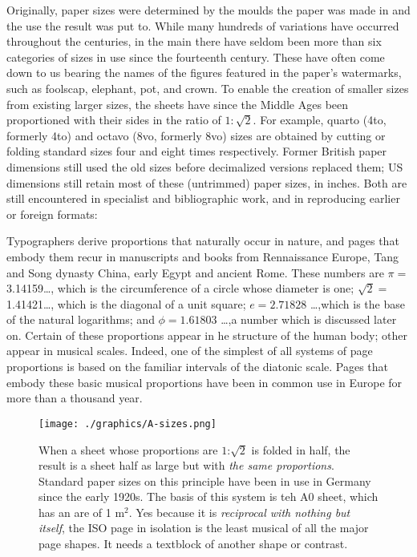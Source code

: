 Originally, paper sizes were determined by the moulds the paper was
made in and the use the result was put to. While many hundreds of variations have occurred throughout the centuries, in the main there have seldom been more than six categories of sizes in use since the fourteenth century. These have often come down to us bearing the names of the figures featured in the paper's watermarks, such as foolscap,
elephant, pot, and crown. To enable the creation of smaller sizes from
existing larger sizes, the sheets have since the Middle Ages been proportioned
with their sides in the ratio of \(1:\sqrt{2}\). For example, quarto (4to,
formerly 4to) and octavo (8vo, formerly 8vo) sizes are obtained by cutting
or folding standard sizes four and eight times respectively.
Former British paper dimensions still used the old sizes before decimalized
versions replaced them; US dimensions still retain most of these
(untrimmed) paper sizes, in inches. Both are still encountered in specialist and bibliographic work, and in reproducing earlier or foreign formats:



Typographers derive proportions that naturally occur in nature, and pages that embody
them recur in manuscripts and books from Rennaissance Europe, Tang and Song dynasty
China, early Egypt and ancient Rome.  
These numbers are $\pi=$3.14159\ldots , which is the circumference of a circle whose diameter
is one; $\sqrt{2}=$1.41421\ldots , which is the diagonal of a unit square; 
$e=2.71828$  \ldots ,which is the base of the natural logarithms; and $\phi=1.61803$ \ldots ,a number which is discussed later on. Certain of these proportions appear in he structure of the human body; other appear in musical scales. Indeed, one of the simplest of all systems of 
page proportions is based on the familiar intervals of the diatonic scale. Pages that
embody these basic musical proportions have been in common use in Europe for more than a thousand year.

\begin{figure}[hb]
\centering
\drawcanons
\end{figure}


\begin{figure}
  \texttt{[image: ./graphics/A-sizes.png]}
  \caption{\large When a sheet whose proportions are $1$:$\surd{2}$ is folded in half, the result is a sheet half as large but with \emph{the same proportions}. Standard paper sizes on this principle have been in use in Germany since the early 1920s. The basis of this system is teh A0 sheet, which has an are of 1 m$^2$. Yes because it is \textit{reciprocal with nothing but itself}, the ISO page in isolation is the least musical of all the major page shapes. It needs a textblock of another shape or contrast.}
   \label{fig:marginfig1}
\end{figure}

